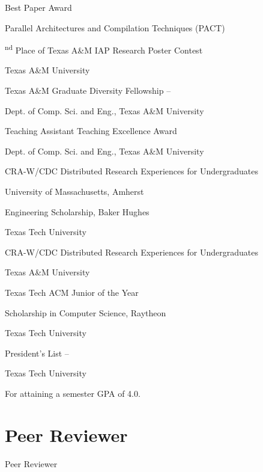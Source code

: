 \documentclass[a4paper,10pt,oneside]{article}
\begin{document}
\begin{body}
\EntryGap
Best Paper Award
\hfill
{}
\par
Parallel Architectures and Compilation Techniques (PACT)

\textsuperscript{nd} Place of Texas A\&M IAP Research Poster Contest
\hfill
{}
\par
Texas A\&M University

\EntryGap
Texas A\&M Graduate Diversity Fellowship
\hfill
{}--
\par
Dept. of Comp. Sci. and Eng., Texas A\&M University

\EntryGap
Teaching Assistant Teaching Excellence Award
\hfill
{}
\par
Dept. of Comp. Sci. and Eng., Texas A\&M University

\EntryGap
CRA-W/CDC Distributed Research Experiences for Undergraduates
\hfill
{}
\par
University of Massachusetts, Amherst

\EntryGap
Engineering Scholarship,
Baker Hughes
\hfill
{}
\par
Texas Tech University

\EntryGap
CRA-W/CDC Distributed Research Experiences for Undergraduates
\hfill
{}
\par
Texas A\&M University

\EntryGap
Texas Tech ACM Junior of the Year
\hfill
{}

\EntryGap
Scholarship in Computer Science,
Raytheon
\hfill
{}
\par
Texas Tech University

\EntryGap
President's List
\hfill
{} --
\par
Texas Tech University
\begin{detail}
For attaining a semester GPA of 4.0.
\end{detail}





\section{Peer Reviewer}
{Peer Reviewer}


\end{body}
\end{document}
